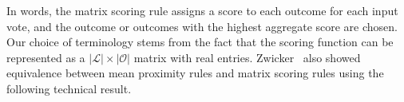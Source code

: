 \documentclass[prodmode,acmec]{ec-acmsmall}
\newcommand{\calL}{{\mathcal{L}}}
\newcommand{\calO}{{\mathcal{O}}}
\DeclareMathOperator*{\argmin}{arg\,min}
\begin{document}


\noindent
In words, the matrix scoring rule assigns a score to each outcome for each input vote, and the outcome or outcomes with the highest aggregate score are chosen. Our choice of terminology stems from the fact that the scoring function can be represented as a $|\calL| \times |\calO|$ matrix with real entries. Zwicker~ also showed equivalence between mean proximity rules and matrix scoring rules using the following technical result. %
\end{document}
